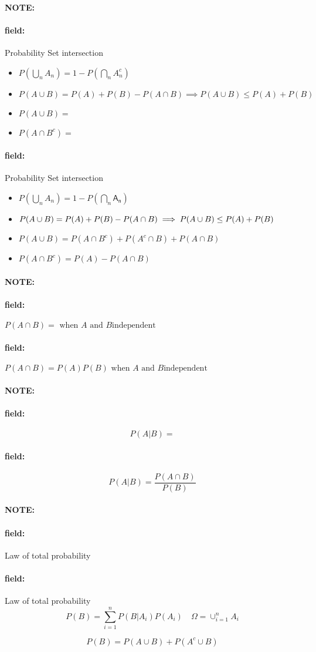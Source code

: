 \documentclass[12pt]{article}
\newenvironment{note}{\paragraph{NOTE:}}{}
\newenvironment{field}{\paragraph{field:}}{}
\begin{document}
\begin{note}
  \begin{field}
    Probability Set intersection
    \begin{itemize}
      \item $P(\bigcup_n A_n)
        = 1 - P(\bigcap_n A_n^c)$
      \item $P(A \cup B) = P(A) + P(B) - P(A \cap B)
        \implies P(A \cup B) \leq P(A) + P(B)$
      \item $P(A \cup B)
        = $
      \item $P(A \cap B^c) = $
    \end{itemize}
  \end{field}
  \begin{field}
    Probability Set intersection
    \begin{itemize}
      \item $P(\bigcup_n A_n)
        = 1 - P(\bigcap_n \mathsf{A_n})$
      \item $P(A \cup B) = P(A) + P(B) - P(A \cap B)\\[1ex]
        \implies P(A \cup B) \le P(A) + P(B)$
      \item $P(A \cup B)
        = P(A \cap B^c) + P(A^c \cap B) + P(A \cap B)$
      \item $P(A \cap B^c) = P(A) - P(A \cap B)$
    \end{itemize}
  \end{field}
\end{note}

\begin{note}
  \begin{field}
    $P(A \cap B) =  \text{ when }A \text{ and } B \text{independent}$
  \end{field}
  \begin{field}
    $P(A \cap B) = P(A)P(B) \text{ when }A \text{ and } B \text{independent}$
  \end{field}
  \end{note}

\begin{note}
  \begin{field}
    $$P(A|B) = $$
  \end{field}
  \begin{field}
    $$P(A|B) = \frac{P(A\cap B)}{P(B)}$$
  \end{field}
\end{note}

\begin{note}
  \begin{field}
    Law of total probability
  \end{field}
  \begin{field}
    Law of total probability
    $$P(B) = \sum_{i=1}^n P(B|A_i)P(A_i) \quad \Omega = \cup_{i=1}^n A_i$$

    $$P(B) = P(A \cup B) + P(A^c \cup B) $$
   \end{field}
\end{note}
\end{document}
